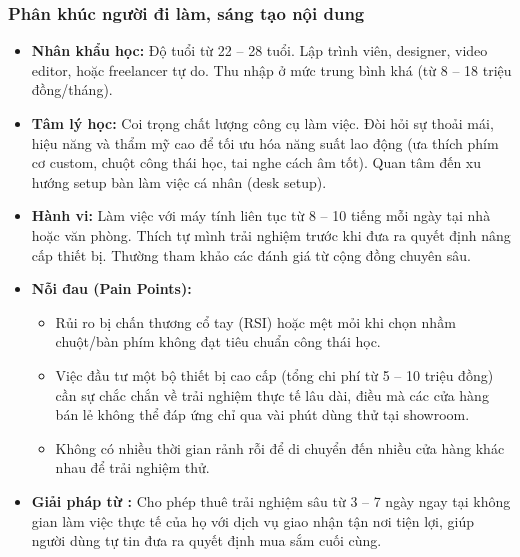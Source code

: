\subsubsection{Phân khúc người đi làm, sáng tạo nội dung}
\begin{itemize}
    \item \textbf{Nhân khẩu học:} Độ tuổi từ 22 -- 28 tuổi. Lập trình viên, designer, video editor, hoặc freelancer tự do. Thu nhập ở mức trung bình khá (từ 8 -- 18 triệu đồng/tháng).
    \item \textbf{Tâm lý học:} Coi trọng chất lượng công cụ làm việc. Đòi hỏi sự thoải mái, hiệu năng và thẩm mỹ cao để tối ưu hóa năng suất lao động (ưa thích phím cơ custom, chuột công thái học, tai nghe cách âm tốt). Quan tâm đến xu hướng setup bàn làm việc cá nhân (desk setup).
    \item \textbf{Hành vi:} Làm việc với máy tính liên tục từ 8 -- 10 tiếng mỗi ngày tại nhà hoặc văn phòng. Thích tự mình trải nghiệm trước khi đưa ra quyết định nâng cấp thiết bị. Thường tham khảo các đánh giá từ cộng đồng chuyên sâu.
    \item \textbf{Nỗi đau (Pain Points):}
    \begin{itemize}
        \item Rủi ro bị chấn thương cổ tay (RSI) hoặc mệt mỏi khi chọn nhầm chuột/bàn phím không đạt tiêu chuẩn công thái học.
        \item Việc đầu tư một bộ thiết bị cao cấp (tổng chi phí từ 5 -- 10 triệu đồng) cần sự chắc chắn về trải nghiệm thực tế lâu dài, điều mà các cửa hàng bán lẻ không thể đáp ứng chỉ qua vài phút dùng thử tại showroom.
        \item Không có nhiều thời gian rảnh rỗi để di chuyển đến nhiều cửa hàng khác nhau để trải nghiệm thử.
    \end{itemize}
    \item \textbf{Giải pháp từ \projectname{}:} Cho phép thuê trải nghiệm sâu từ 3 -- 7 ngày ngay tại không gian làm việc thực tế của họ với dịch vụ giao nhận tận nơi tiện lợi, giúp người dùng tự tin đưa ra quyết định mua sắm cuối cùng.
\end{itemize}

